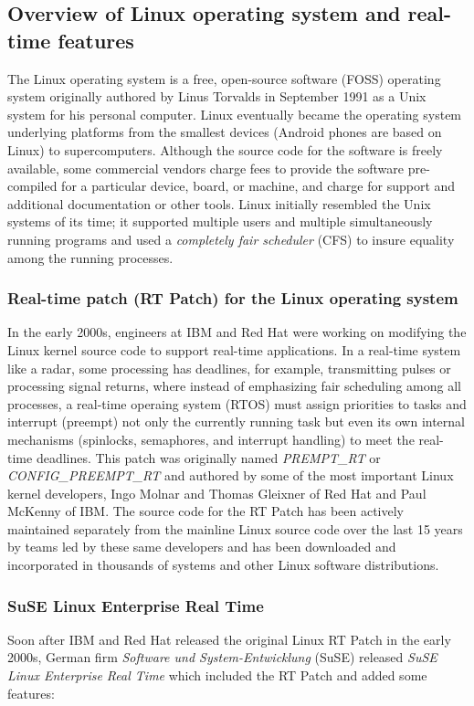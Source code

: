 \documentclass[12pt]{article}
\begin{document}
\subsection{Overview of Linux operating system and real-time features}
The Linux operating system is a free, open-source software (FOSS) operating
system originally authored by Linus Torvalds in September 1991 as a Unix system
for his personal computer.  Linux eventually became the operating system
underlying platforms from the smallest devices (Android phones are based on
Linux) to supercomputers. Although the source code for the software is freely
available, some commercial vendors charge fees to provide the software
pre-compiled for a particular device, board, or machine, and charge for support
and additional documentation or other tools.  Linux initially resembled the Unix
systems of its time; it supported multiple users and multiple simultaneously
running programs and used a \emph{completely fair scheduler} (CFS) to insure
equality among the running processes.

\subsubsection{Real-time patch (RT Patch) for the Linux operating system}
In the early 2000s, engineers at IBM and Red Hat were working on modifying the
Linux kernel source code to support real-time applications.  In a real-time
system like a radar, some processing has deadlines, for example, transmitting
pulses or processing signal returns, where instead of emphasizing fair
scheduling among all processes, a real-time operaing system (RTOS) must assign
priorities to tasks and interrupt (preempt) not only the currently running task
but even its own internal mechanisms (spinlocks, semaphores, and interrupt
handling) to meet the real-time deadlines.  This patch was originally named
\emph{PREMPT\_RT} or \emph{CONFIG\_PREEMPT\_RT} and authored by some of the most
important Linux kernel developers, Ingo Molnar and Thomas Gleixner of Red Hat
and Paul McKenny of IBM.  The source code for the RT Patch has been actively
maintained separately from the mainline Linux source code over the last 15 years
by teams led by these same developers and has been downloaded and incorporated
in thousands of systems and other Linux software distributions.

\subsubsection{SuSE Linux Enterprise Real Time}
Soon after IBM and Red Hat released the original Linux RT Patch in the early
2000s, German firm \emph{Software und System-Entwicklung} (SuSE) released
\emph{SuSE Linux Enterprise Real Time} which included the RT Patch and added
some features:
\end{document}
